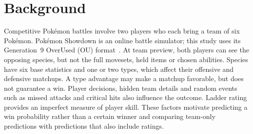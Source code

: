 \section{Background}
Competitive Pok\'emon battles involve two players who each bring a team of six
Pok\'emon. Pok\'emon Showdown is an online battle simulator; this study uses its
Generation~9 OverUsed (OU) format~\cite{showdown}. At team preview, both players
can see the opposing species, but not the full movesets, held items or chosen
abilities. Species have six base statistics and one or two types, which affect
their offensive and defensive matchups. A type advantage may make a matchup
favorable, but does not guarantee a win. Player decisions, hidden team details
and random events such as missed attacks and critical hits also influence the
outcome. Ladder rating provides an imperfect measure of player skill. These
factors motivate predicting a win probability rather than a certain winner and
comparing team-only predictions with predictions that also include ratings.
